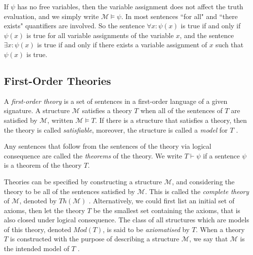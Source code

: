 \documentclass[11pt]{report}
\theoremstyle{definition}
\theoremstyle{theorem}
\theoremstyle{lemma}
\begin{document}
\noindent
If $\psi$ has no free variables, then the variable assignment does not affect the truth evaluation, and we simply write $\mathcal{M} \vDash \psi$.
In most sentences ``for all" and ``there exists" quantifiers are involved.
So the sentence $\forall x: \psi(x)$ is true if and only if $\psi(x)$ is true for all variable assignments of the variable $x$, and the sentence $\exists x: \psi(x)$ is true if and only if there exists a variable assignment of $x$ such that $\psi(x)$ is true.

\subsection{First-Order Theories}
A \emph{first-order theory} is a set of sentences in a first-order language of a given signature.
A structure $\mathcal M$ satisfies a theory $T$ when all of the sentences of $T$ are satisfied by $\mathcal{M}$, written $\mathcal{M} \vDash T$. If there is a structure that satisfies a theory, then the theory is called \emph{satisfiable}, moreover, the structure is called a \emph{model} for $T$ \cite[ch.~2.5]{selinger}.

Any sentences that follow from the sentences of the theory via logical consequence are called the \emph{theorems} of the theory. We write $T\vdash \psi$ if a sentence $\psi$ is a theorem of the theory $T$.

Theories can be specified by constructing a structure $\mathcal{M}$, and considering the theory to be all of the sentences satisfied by $\mathcal{M}$. This is called the \emph{complete theory} of $\mathcal{M}$, denoted by $\mathit{Th}(\mathcal{M})$ \cite[ch.~1]{stanmodel}.
Alternatively, we could first list an initial set of axioms, then let the theory $T$ be the smallest set containing the axioms, that is also closed under logical consequence. The class of all structures which are models of this theory, denoted $\mathit{Mod(T)}$, is said to be \emph{axiomatised} by $T$.
When a theory $T$ is constructed with the purpose of describing a structure $\mathcal{M}$, we say that $\mathcal{M}$ is the intended model of $T$ \cite[ch.~2.2]{shortermodel}.
\end{document}
